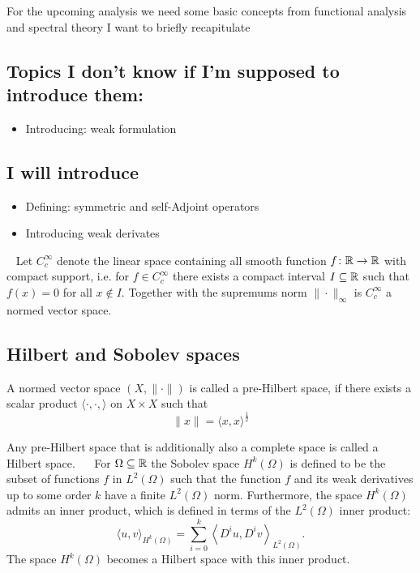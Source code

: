 For the upcoming analysis we need some basic concepts from functional analysis and spectral theory I want to briefly recapitulate

\subsection*{Topics I don't know if I'm supposed to introduce them:} 
\begin{itemize}
	\item Introducing: weak formulation
\end{itemize}
\subsection*{I will introduce}
\begin{itemize}
	\item Defining: symmetric and self-Adjoint operators 
	\item Introducing weak derivates
\end{itemize}
~\newline
Let $C_{c}^{\infty}$ denote the linear space containing all smooth function $f \colon \mathbb{R} \rightarrow \mathbb{R}$ with compact support, i.e. for $f \in C_{c}^{\infty}$ there exists a compact interval $I \subseteq \mathbb{R}$ such that $f(x) = 0$ for all $x \notin I$. Together with the supremums norm $\| \cdot \|_{\infty}$ is $C_{c}^{\infty}$ a normed vector space.

\subsection*{Hilbert and Sobolev spaces}
A normed vector space $(X, \| \cdot \|)$ is called a pre-Hilbert space, if there exists a scalar product $\langle \cdot, \cdot, \rangle$ on $X \times X$ such that
	\[ \| x \| = \langle x, x \rangle^{\frac{1}{2}} \] 

Any pre-Hilbert space that is additionally also a complete space is called a Hilbert space.
~\newline ~\newline
For $\Omega \subseteq \mathbb{R}$ the Sobolev space $H^{k}(\Omega)$ is defined to be the subset of functions $f$ in $L^{2}(\Omega)$ such that the function $f$ and its weak derivatives up to some order $k$ have a finite $L^{2}(\Omega)$ norm. Furthermore, the space $H^{k}(\Omega)$ admits an inner product, which is defined in terms of the $L^{2}(\Omega)$ inner product: 
	\[ \langle u , v \rangle_{H^{k}(\Omega)} = \sum_{i=0}^{k} \left\langle D^{i}u , D^{i} v \right\rangle_{L^{2}(\Omega)}. \] 
The space $H^{k}(\Omega)$ becomes a Hilbert space with this inner product.

